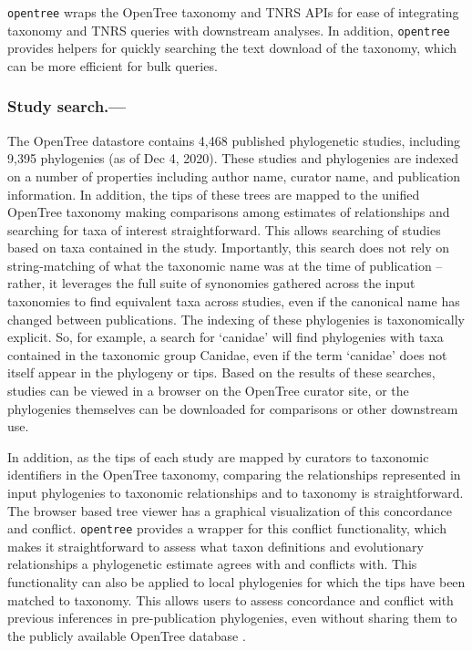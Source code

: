 \documentclass[oupdraft]{sysbio_sse}
\begin{document}
\texttt{opentree} wraps the OpenTree taxonomy and TNRS APIs for ease of integrating taxonomy and TNRS queries with downstream analyses. In addition, \texttt{opentree} provides helpers for quickly searching the text download of the taxonomy, which can be more efficient for bulk queries.


\subsubsection{Study search.---} The OpenTree datastore contains 4,468 published phylogenetic studies, including 9,395 phylogenies (as of Dec 4, 2020).
These studies and phylogenies are indexed on a number of properties including author name, curator name, and publication information.
In addition, the tips of these trees are mapped to the unified OpenTree taxonomy making comparisons among estimates of relationships and searching for taxa of interest straightforward.
This allows searching of studies based on taxa contained in the study.
Importantly, this search does not rely on string-matching of what the taxonomic name was at the time of publication -- rather, it leverages the full suite of synonomies gathered across the input taxonomies to find equivalent taxa across studies, even if the canonical name has changed between publications.
The indexing of these phylogenies is taxonomically explicit.
So, for example, a search for `canidae' will find phylogenies with taxa contained in the taxonomic group Canidae, even if the term `canidae' does not itself appear in the phylogeny or tips.
Based on the results of these searches, studies can be viewed in a browser on the OpenTree curator site, or the phylogenies themselves can be downloaded for comparisons or other downstream use.

In addition, as the tips of each study are mapped by curators to taxonomic identifiers in the OpenTree taxonomy, comparing the relationships represented in input phylogenies to taxonomic relationships and to taxonomy is straightforward. The browser based tree viewer has a graphical visualization of this concordance and conflict. \texttt{opentree} provides a wrapper for this conflict functionality, which makes it straightforward to assess what taxon definitions and evolutionary relationships a phylogenetic estimate agrees with and conflicts with. This functionality can also be applied to local phylogenies for which the tips have been matched to taxonomy. This allows users to assess concordance and conflict with previous inferences in pre-publication phylogenies, even without sharing them to the publicly available OpenTree database \citep{reyes_physcraper_2020, mctavish_phylesystem_2015}.
\end{document}

